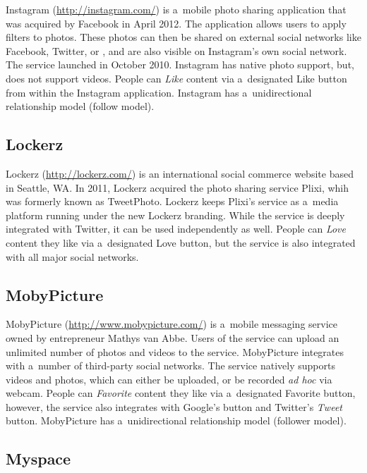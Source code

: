 Instagram (\url{http://instagram.com/})
is a~mobile photo sharing application
that was acquired by Facebook in April 2012.
The application allows users to apply filters to photos.
These photos can then be shared on external social networks
like Facebook, Twitter, or \googleplus,
and are also visible on Instagram's own social network.
The service launched in October 2010.
Instagram has native photo support, but,
does not support videos.
People can \emph{Like} content via a~designated Like button
from within the Instagram application.
Instagram has a~unidirectional relationship model (follow model).

\subsection{Lockerz}

Lockerz (\url{http://lockerz.com/}) is an international
social commerce website based in Seattle, WA. 
In 2011, Lockerz acquired the photo sharing service Plixi,
whih was formerly known as TweetPhoto.
Lockerz keeps Plixi's service as a~media platform running
under the new Lockerz branding.
While the service is deeply integrated with Twitter,
it can be used independently as well.
People can \emph{Love} content they like via
a~designated Love button,
but the service is also integrated with all major social networks.

\subsection{MobyPicture}

MobyPicture (\url{http://www.mobypicture.com/})
is a~mobile messaging service
owned by entrepreneur Mathys van Abbe.
Users of the service can upload an unlimited number of
photos and videos to the service.
MobyPicture integrates with a~number of
third-party social networks.
The service natively supports videos and photos,
which can either be uploaded, or be recorded \emph{ad hoc}
via webcam.
People can \emph{Favorite} content they like via
a~designated Favorite button,
however, the service also integrates with Google's
\emph{\plusone} button and Twitter's \emph{Tweet} button. 
MobyPicture has a~unidirectional relationship model
(follower model).

\subsection{Myspace}


